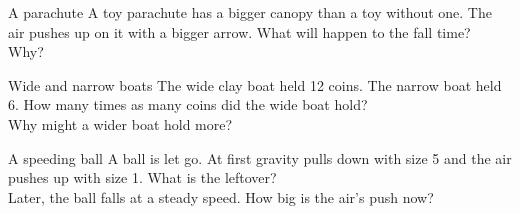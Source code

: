 \begin{puzzle}{A parachute}
A toy parachute has a bigger canopy than a toy without one. The air pushes up on it with a bigger arrow. What will happen to the fall time? \wline[3cm]\\
Why? \wline[4cm]
\end{puzzle}

\begin{puzzle}{Wide and narrow boats}
The wide clay boat held 12 coins. The narrow boat held 6. How many times as many coins did the wide boat hold? \wline[2cm]\\
Why might a wider boat hold more? \wline[4cm]
\end{puzzle}

\begin{puzzle}{A speeding ball}
A ball is let go. At first gravity pulls down with size 5 and the air pushes up with size 1. What is the leftover? \wline[3cm]\\
Later, the ball falls at a steady speed. How big is the air's push now? \wline[2cm]
\end{puzzle}
\clearpage
